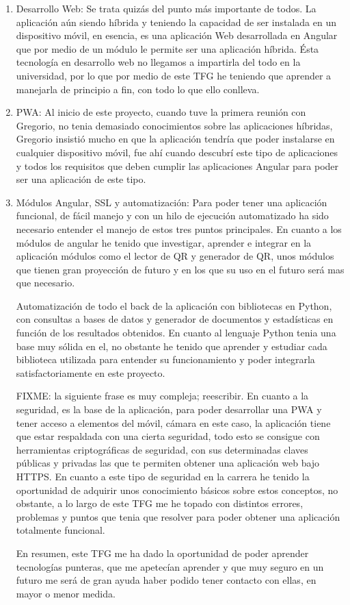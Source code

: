 \documentclass[a4paper, 12pt]{book}
\begin{document}
\begin{enumerate}
  \item Desarrollo Web: Se trata quizás del punto más importante de todos. La aplicación aún siendo híbrida y teniendo la capacidad de ser instalada en un dispositivo móvil, en esencia, es una aplicación Web desarrollada en Angular que por medio de un módulo le permite ser una aplicación híbrida. Ésta tecnología en desarrollo web no llegamos a impartirla del todo en la universidad, por lo que por medio de este TFG he teniendo que aprender a manejarla de principio a fin, con todo lo que ello conlleva.
  
  \item PWA: Al inicio de este proyecto, cuando tuve la primera reunión con Gregorio, no tenia demasiado conocimientos sobre las aplicaciones híbridas, Gregorio insistió mucho en que la aplicación tendría que poder instalarse en cualquier dispositivo móvil, fue ahí cuando descubrí este tipo de aplicaciones y todos los requisitos que deben cumplir las aplicaciones Angular para poder ser una aplicación de este tipo.
  
	\item Módulos Angular, SSL y automatización: Para poder tener una aplicación funcional, de fácil manejo y con un hilo de ejecución automatizado ha sido necesario entender el manejo de estos tres puntos principales. En cuanto a los módulos de angular he tenido que investigar, aprender e integrar en la aplicación módulos como el lector de QR y generador de QR, unos módulos que tienen gran proyección de futuro y en los que su uso en el futuro será mas que necesario.
	
	Automatización de todo el back de la aplicación con bibliotecas en Python, con consultas a bases de datos y generador de documentos y estadísticas en función de los resultados obtenidos. En cuanto al lenguaje Python tenia una base muy sólida en el, no obstante he tenido que aprender y estudiar cada biblioteca utilizada para entender su funcionamiento y poder integrarla satisfactoriamente en este proyecto.
	
	FIXME: la siguiente frase es muy compleja; reescribir. En cuanto a la seguridad, es la base de la aplicación, para poder desarrollar una PWA y tener acceso a elementos del móvil, cámara en este caso, la aplicación tiene que estar respaldada con una cierta seguridad, todo esto se consigue con herramientas criptográficas de seguridad, con sus determinadas claves públicas y privadas las que te permiten obtener una aplicación web bajo HTTPS. En cuanto a este tipo de seguridad en la carrera he tenido la oportunidad de adquirir unos conocimiento básicos sobre estos conceptos, no obstante, a lo largo de este TFG me he topado con distintos errores, problemas y puntos que tenia que resolver para poder obtener una  aplicación totalmente funcional.
	
En resumen, este TFG me ha dado la oportunidad de poder aprender tecnologías punteras, que me apetecían aprender y que muy seguro en un futuro me será de gran ayuda haber podido tener contacto con ellas, en mayor o menor medida.
\end{enumerate}
\end{document}
